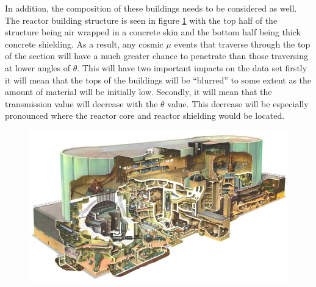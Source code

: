 

In addition, the composition of these buildings needs to be considered as well. The reactor building structure is seen in figure \ref{fig:wylfaReactorRoughStructure} with the top half of the structure being air wrapped in a concrete skin and the bottom half being thick concrete shielding. As a result, any cosmic $\mu$ events that traverse through the top of the section will have a much greater chance to penetrate than those traversing at lower angles of $\theta$. This will have two important impacts on the data set firstly it will mean that the tops of the buildings will be ``blurred'' to some extent as the amount of material will be initially low. Secondly, it will mean that the transmission value will decrease with the $\theta$ value. This decrease will be especially pronounced where the reactor core and reactor shielding would be located. 

\begin{figure}[!h]
 \centering
 \includegraphics[width=0.7\linewidth]{Chapter5/Figs/wylfaRasterNew/wylfaReactorRoughStructure.png}
 \label{fig:wylfaReactorRoughStructure}
\end{figure}


